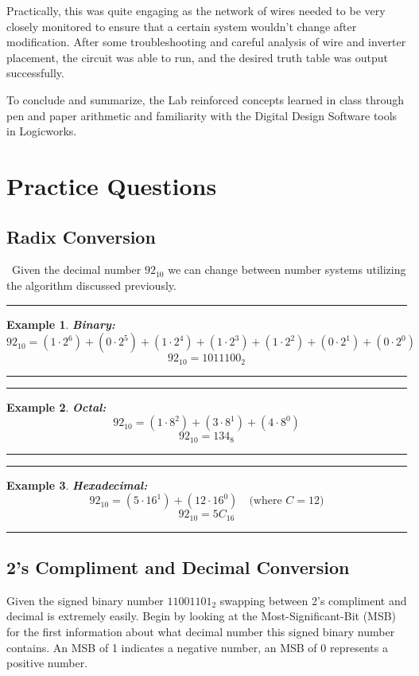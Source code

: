 \documentclass[12pt]{report}
\newtheorem{example}{Example}
\newenvironment{examp}
{
    \vspace{0.5cm}
    \hrule
    \begin{example}
}
{
    \hrule
    \vspace{0.5cm}
    \end{example}
}
\begin{document}
Practically, this was quite engaging as the network of wires needed to be very closely monitored to ensure that a certain system wouldn't change after modification. After some troubleshooting and careful analysis of wire and inverter placement, the circuit was able to run, and the desired truth table was output successfully.

To conclude and summarize, the Lab reinforced concepts learned in class through pen and paper arithmetic and familiarity with the Digital Design Software tools in Logicworks.
\section*{Practice Questions}
\subsection*{Radix Conversion} \
Given the decimal number \(92_{10}\) we can change between number systems utilizing the algorithm discussed previously.
\begin{examp}
	\textbf{Binary:}
	\[
		92_{10} = (1 \cdot 2^6) + (0 \cdot 2^5) + (1 \cdot 2^4) + (1 \cdot 2^3) + (1 \cdot 2^2) + (0 \cdot 2^1) + (0 \cdot 2^0)
	\]
	\[
		92_{10} = 1011100_2
	\]
\end{examp}

\begin{examp}
	\textbf{Octal:}
	\[
		92_{10} = (1 \cdot 8^2) + (3 \cdot 8^1) + (4 \cdot 8^0)
	\]
	\[
		92_{10} = 134_8
	\]
\end{examp}

\begin{examp}
	\textbf{Hexadecimal:}
	\[
		92_{10} = (5 \cdot 16^1) + (12 \cdot 16^0) \quad \text{(where \(C = 12\))}
	\]
	\[
		92_{10} = 5C_{16}
	\]
\end{examp}
\pagebreak
\subsection*{2's Compliment and Decimal Conversion}
Given the signed binary number \(11001101_2\) swapping between 2's compliment and decimal is extremely easily. Begin by looking at the Most-Significant-Bit (MSB) for the first information about what decimal number this signed binary number contains. An MSB of 1 indicates a negative number, an MSB of 0 represents a positive number.
\end{document}
